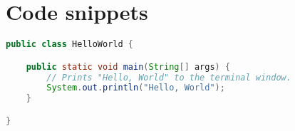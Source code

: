 \section{Code snippets}
\ea
\begin{lstlisting}[language=java]
 public class HelloWorld {

    public static void main(String[] args) {
        // Prints "Hello, World" to the terminal window.
        System.out.println("Hello, World");
    }

}
\end{lstlisting}
\z


